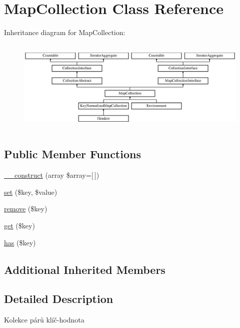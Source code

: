 \hypertarget{class_pes_1_1_collection_1_1_map_collection}{}\section{Map\+Collection Class Reference}
\label{class_pes_1_1_collection_1_1_map_collection}
Inheritance diagram for Map\+Collection\+:\begin{figure}[H]
\begin{center}
\leavevmode
\includegraphics[height=4.516129cm]{class_pes_1_1_collection_1_1_map_collection}
\end{center}
\end{figure}
\subsection*{Public Member Functions}
\begin{DoxyCompactItemize}
\item 
\mbox{\hyperlink{class_pes_1_1_collection_1_1_map_collection_a051ddc27b65d0b3d514a7b832bb60912}{\+\_\+\+\_\+construct}} (array \$array=\mbox{[}$\,$\mbox{]})
\item 
\mbox{\hyperlink{class_pes_1_1_collection_1_1_map_collection_aab787bd83f84f4215dceb35f7c305eee}{set}} (\$key, \$value)
\item 
\mbox{\hyperlink{class_pes_1_1_collection_1_1_map_collection_a95483af4e2c07dc9893fe058b026bd5d}{remove}} (\$key)
\item 
\mbox{\hyperlink{class_pes_1_1_collection_1_1_map_collection_a24a9bf83a1002d46ece83a93d14bd921}{get}} (\$key)
\item 
\mbox{\hyperlink{class_pes_1_1_collection_1_1_map_collection_a8b23dbb48f0c3c94725695191d06981a}{has}} (\$key)
\end{DoxyCompactItemize}
\subsection*{Additional Inherited Members}


\subsection{Detailed Description}
Kolekce párů klíč-\/hodnota 

